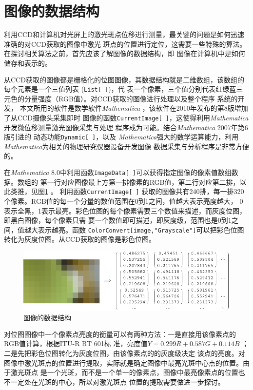 \documentclass[UTF8,a4paper,12pt]{article}
\begin{document}
\section{图像的数据结构}
利用CCD和计算机对光屏上的激光斑点位移进行测量，最关键的问题是如何迅速准确的对CCD获取的图像中激光
斑点的位置进行定位，这需要一些特殊的算法。在探讨相关算法之前，首先应该了解图像的数据结构，即
图像在计算机中是如何储存和表示的。

从CCD获取的图像都是栅格化的位图图像，其数据结构就是二维数组，该数组的每个元素是一个三值列表
(\verb|List[ ]|)，代
表一个像素，三个值分别代表红绿蓝三元色的分量强度（RGB值）。对CCD获取的图像进行处理以及整个程序
系统的开发，
本文所用的软件是数学软件\textit{Mathematica}\cite{mathematicabook}
，该软件在2010年发布的第8版增加了从CCD摄像头采集即时
图像的函数\verb|CurrentImage[ ]|，这使得利用\textit{Mathematica}开发微位移测量激光图像采集与处理
程序成为可能。结合\textit{Mathematica} 2007年第6版引进的
动态功能\cite{cookbook}\verb|Dynamic[ ]|，以及
\textit{Mathematica}强大的数学运算能力，利用\textit{Mathematica}为相关的物理研究仪器设备开发图像
数据采集与分析程序是非常方便的。

在\textit{Mathematica} 8.0中利用函数\verb|ImageData[ ]|可以获得指定图像的像素值数组数据。数组的
第一行对应图像最上方第一排像素的RGB值，第二行对应第二排，以此类推，见图\;\ref{fig:pic-data} 。
利用函数\verb|CurrentImage[ ]|
获取的图像共有240排，每一排320个像素。RGB值的每一个分量的数值范围在0到1之间，值越大表示亮度越大，
0表示全黑，1表示最亮。彩色位图的每个像素需要三个数值来描述，而灰度位图，即黑白图像，每个像素只需
要一个数值即可描述，即灰度级，范围也是0到1之间，值越大表示越亮。函数
\verb|ColorConvert[image,"Grayscale"]|可以把彩色位图转化为灰度位图。从CCD获取的图像是彩色位图。

\begin{figure}[htbp]
\centering
\includegraphics[width=150mm]{image/pic-data.pdf}
\caption{图像的数据结构}\label{fig:pic-data}
\end{figure}

对位图图像中一个像素点亮度的衡量可以有两种方法：一是直接用该像素点的RGB值计算，根据ITU-R BT 601标
准，亮度值$Y = 0.299R + 0.587G + 0.114B$\cite{yuvtorgb}
；二是先把彩色位图转化为灰度位图，由该像素点的的灰度级决定
该点的亮度。对图像中激光斑点的位置进行提取，实际就是确定图像中最亮光斑中心点的位置。由于激光斑点
是一个光斑，而不是一个单一的像素点，图像中最亮像素点的位置也不一定处在光斑的中心，所以对激光斑点
位置的提取需要做进一步探讨。
\end{document}
